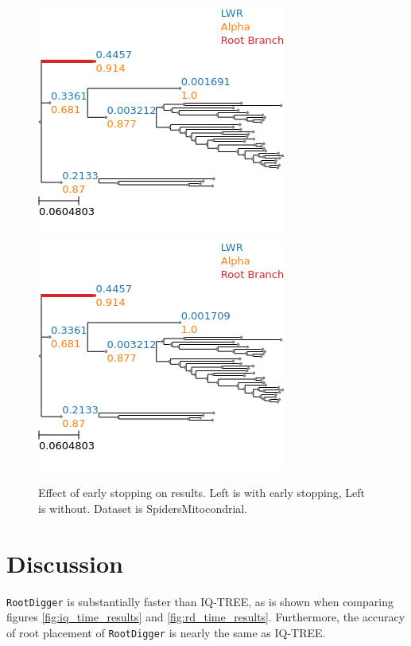 \documentclass{article}
\newcommand{\RootDiggertt}{\texttt{RootDigger}}
\begin{document}
\begin{figure}[H]
  \begin{center}
    \includegraphics[width=.4\linewidth]{figs/early_stop_tests/es_test_mito_no_outgroup.png}
    \includegraphics[width=.4\linewidth]{figs/early_stop_tests/es_test_mito_no_outgroup_noes.png}
    \caption{Effect of early stopping on results. Left is with early stopping,
    Left is without. Dataset is SpidersMitocondrial.}
    \label{fig:es_mito}
  \end{center}
\end{figure}

\section{Discussion}

\RootDiggertt{} is substantially faster than IQ-TREE, as is shown when comparing
figures \ref{fig:iq_time_results} and \ref{fig:rd_time_results}. Furthermore,
the accuracy of root placement of \RootDiggertt{} is nearly the same as IQ-TREE.
\end{document}
